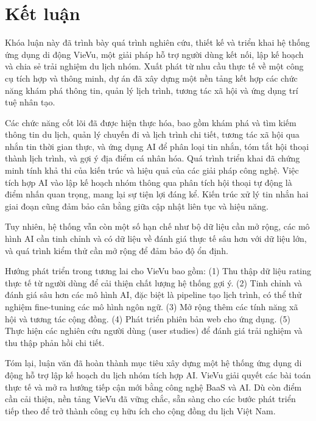 \chapter*{Kết luận}

\noindent Khóa luận này đã trình bày quá trình nghiên cứu, thiết kế và triển khai hệ thống ứng dụng di động VieVu, một giải pháp hỗ trợ người dùng kết nối, lập kế hoạch và chia sẻ trải nghiệm du lịch nhóm. Xuất phát từ nhu cầu thực tế về một công cụ tích hợp và thông minh, dự án đã xây dựng một nền tảng kết hợp các chức năng khám phá thông tin, quản lý lịch trình, tương tác xã hội và ứng dụng trí tuệ nhân tạo.


Các chức năng cốt lõi đã được hiện thực hóa, bao gồm khám phá và tìm kiếm thông tin du lịch, quản lý chuyến đi và lịch trình chi tiết, tương tác xã hội qua nhắn tin thời gian thực, và ứng dụng AI để phân loại tin nhắn, tóm tắt hội thoại thành lịch trình, và gợi ý địa điểm cá nhân hóa. Quá trình triển khai đã chứng minh tính khả thi của kiến trúc và hiệu quả của các giải pháp công nghệ. Việc tích hợp AI vào lập kế hoạch nhóm thông qua phân tích hội thoại tự động là điểm nhấn quan trọng, mang lại sự tiện lợi đáng kể. Kiến trúc xử lý tin nhắn hai giai đoạn cũng đảm bảo cân bằng giữa cập nhật liên tục và hiệu năng.

Tuy nhiên, hệ thống vẫn còn một số hạn chế như bộ dữ liệu cần mở rộng, các mô hình AI cần tinh chỉnh và có dữ liệu về đánh giá thực tế sâu hơn với dữ liệu lớn, và quá trình kiểm thử cần mở rộng để đảm bảo độ ổn định.

Hướng phát triển trong tương lai cho VieVu bao gồm: (1) Thu thập dữ liệu rating thực tế từ người dùng để cải thiện chất lượng hệ thống gợi ý. (2) Tinh chỉnh và đánh giá sâu hơn các mô hình AI, đặc biệt là pipeline tạo lịch trình, có thể thử nghiệm fine-tuning các mô hình ngôn ngữ. (3) Mở rộng thêm các tính năng xã hội và tương tác cộng đồng. (4) Phát triển phiên bản web cho ứng dụng. (5) Thực hiện các nghiên cứu người dùng (user studies) để đánh giá trải nghiệm và thu thập phản hồi chi tiết.

Tóm lại, luận văn đã hoàn thành mục tiêu xây dựng một hệ thống ứng dụng di động hỗ trợ lập kế hoạch du lịch nhóm tích hợp AI. VieVu giải quyết các bài toán thực tế và mở ra hướng tiếp cận mới bằng công nghệ BaaS và AI. Dù còn điểm cần cải thiện, nền tảng VieVu đã vững chắc, sẵn sàng cho các bước phát triển tiếp theo để trở thành công cụ hữu ích cho cộng đồng du lịch Việt Nam.